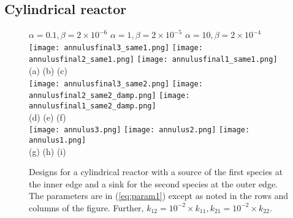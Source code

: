 \documentclass[11pt]{article}
\begin{document}
\subsection{Cylindrical reactor}
\begin{figure}
\label{fig:cyl}
\centering 
    {\small \hspace{0.2in} $\alpha=0.1,\beta=2\times 10^{-6}$ \hspace{0.4in} 
    $\alpha=1,\beta=2\times 10^{-5}$ \hspace{0.4in} 
    $\alpha=10, \beta=2\times 10^{-4}$}\\
    \texttt{[image: annulusfinal3\_same1.png]}
    \texttt{[image: annulusfinal2\_same1.png]}
    \texttt{[image: annulusfinal1\_same1.png]}\\
        \hspace{0.2in} (a) \hspace{1.5in} (b) \hspace{1.5in} (c)\\
    \texttt{[image: annulusfinal3\_same2.png]}
    \texttt{[image: annulusfinal2\_same2\_damp.png]}
    \texttt{[image: annulusfinal1\_same2\_damp.png]}\\
        \hspace{0.2in} (d) \hspace{1.5in} (e) \hspace{1.5in} (f)\\
    \texttt{[image: annulus3.png]}
    \texttt{[image: annulus2.png]}
    \texttt{[image: annulus1.png]}\\
       \hspace{0.2in} (g) \hspace{1.5in} (h) \hspace{1.5in} (i)\\
    \caption{Designs for a cylindrical reactor with a source of the first species at the inner edge and a sink for the second species at the outer edge.  The parameters are in (\ref{eq:param1}) except as noted in the rows and columns of the figure.  Further, $k_{12}=10^{-2} \times k_{11}, k_{21}=10^{-2}\times k_{22}$. \label{fig:cyl}}
\end{figure}
\end{document}
